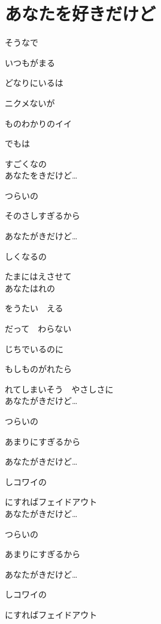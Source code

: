\section{ あなたを好きだけど}
\large{

そうなで

いつもがまる

どなりにいるは

ニクメないが

ものわかりのイイ

でもは

すごくなの
\\

あなたをきだけど…

つらいの

そのさしすぎるから

あなたがきだけど…

しくなるの

たまにはえさせて
\\

あなたはれの

をうたい　える

だって　わらない

じちでいるのに

もしものがれたら

れてしまいそう　やさしさに
\\

あなたがきだけど…

つらいの

あまりにすぎるから

あなたがきだけど…

しコワイの

にすればフェイドアウト
\\

あなたがきだけど…

つらいの

あまりにすぎるから

あなたがきだけど…

しコワイの

にすればフェイドアウト

}